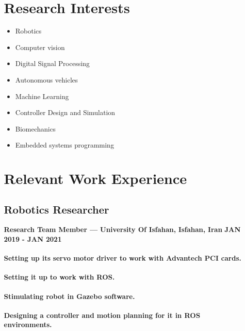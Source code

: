 \documentclass[a4paper]{article}
\begin{document}
    \section{Research Interests}


        \begin{multicols}{2}[]
            \begin{itemize}
                \itemsep0em 
                \item Robotics
                \item Computer vision
                \item Digital Signal Processing
                \item Autonomous vehicles
                \item Machine Learning
                \item Controller Design and Simulation
                \item Biomechanics
                \item Embedded systems programming
            \end{itemize}
        \end{multicols}

    \section{Relevant Work Experience}
        \subsection{Robotics Researcher}
        {\bfseries\small Research Team Member — University Of Isfahan, Isfahan, Iran}
        \hfill
        {\bfseries\small JAN 2019 - JAN 2021}

        \paragraph{Setting up its servo motor driver to work with Advantech PCI cards.}
        \paragraph{Setting it up to work with ROS.}
        \paragraph{Stimulating robot in Gazebo software.}
        \paragraph{Designing a controller and motion planning for it in ROS environments.}
\end{document}
